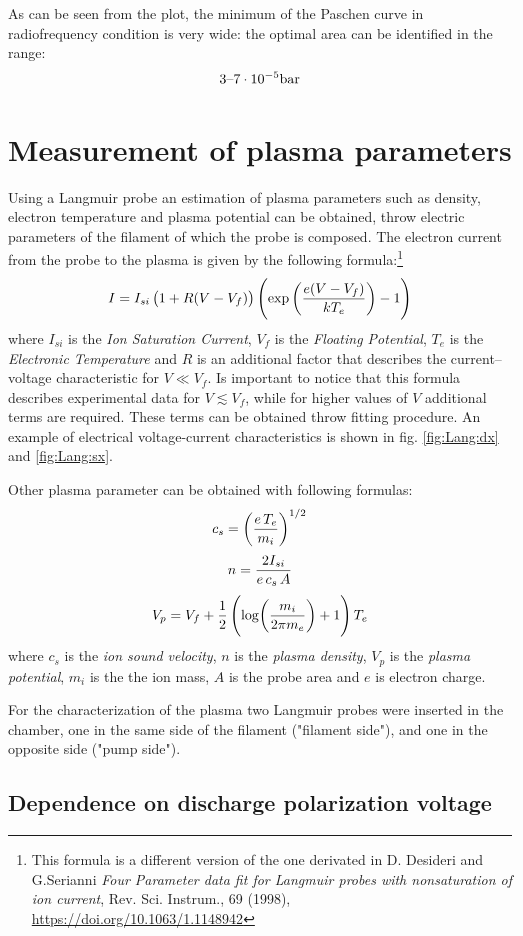 \documentclass[11pt,a4 paper]{article}
\let\oldfrac\frac
\renewcommand{\frac}[3][d]{\ifthenelse{\equal{#1}{d}}{\oldfrac{#2}{#3}}{\nicefrac{#2}{#3}}}
\begin{document}

As can be seen from the plot, the minimum of the Paschen curve in radiofrequency condition is very wide: the optimal area can be identified in the range: $$3\textup{--}7 \cdot 10^{-5}\si{\bar}$$

\section{Measurement of plasma parameters}
Using a Langmuir probe an estimation of plasma parameters such as density, electron temperature and plasma potential can be obtained, throw electric parameters of the filament of which the probe is composed. 
The electron current from the probe to the plasma is given by the following formula:\footnote{This formula is a different version of the one derivated in D. Desideri and G.Serianni \emph{Four Parameter data fit for Langmuir probes with nonsaturation of ion current}, Rev. Sci. Instrum., 69 (1998), \url{https://doi.org/10.1063/1.1148942}}
\[I=I_{si}\left(1+R(V-V_f)\right)\left(\exp\left(\frac{e(V-V_f)}{kT_e}\right)-1\right)\]
where $I_{si}$ is the \emph{Ion Saturation Current}, $V_f$ is the \emph{Floating Potential}, $T_e$ is the \emph{Electronic Temperature} and $R$ is an additional factor that describes the current--voltage characteristic for $V\ll V_f$.
Is important to notice that this formula describes experimental data for $V\lesssim V_f$, while for higher values of $V$ additional terms are required.
These terms can be obtained throw fitting procedure. An example of electrical voltage-current characteristics is shown in fig. \ref{fig:Lang:dx} and \ref{fig:Lang:sx}.



Other plasma parameter can be obtained with following formulas:
\[c_s=\left(\frac{e\,T_e}{m_i}\right)^{1/2}\]
\[n=\frac{2I_{si}}{e\,c_s\,A}\]
\[V_p=V_f+\frac12\left(\log(\frac{m_i}{2\pi m_e})+1\right) T_e\]
where $c_s$ is the \emph{ion sound velocity}, $n$ is the \emph{plasma density}, $V_p$ is the \emph{plasma potential}, $m_i$ is the the ion mass, $A$ is the probe area and $e$ is electron charge.

For the characterization of the plasma two Langmuir probes were inserted in the chamber, one in the same side of the filament ("filament side"), and one in the opposite side ("pump side").

\subsection{Dependence on discharge polarization voltage}
\end{document}
